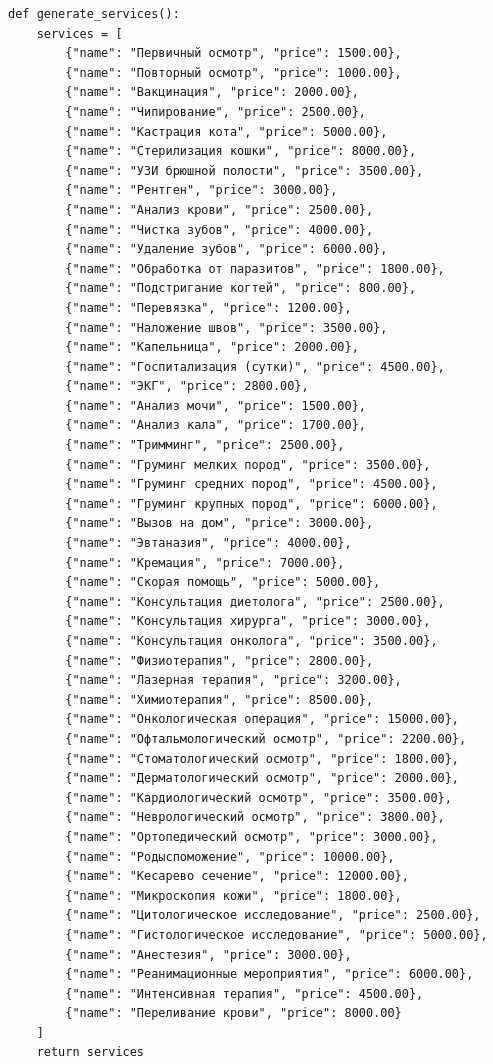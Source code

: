 \documentclass[a4paper]{article}
\begin{document}
\begin{lstlisting}[caption = Генерация значений для таблиц, basicstyle= \scriptsize \ttfamily]
def generate_services():
    services = [
        {"name": "Первичный осмотр", "price": 1500.00},
        {"name": "Повторный осмотр", "price": 1000.00},
        {"name": "Вакцинация", "price": 2000.00},
        {"name": "Чипирование", "price": 2500.00},
        {"name": "Кастрация кота", "price": 5000.00},
        {"name": "Стерилизация кошки", "price": 8000.00},
        {"name": "УЗИ брюшной полости", "price": 3500.00},
        {"name": "Рентген", "price": 3000.00},
        {"name": "Анализ крови", "price": 2500.00},
        {"name": "Чистка зубов", "price": 4000.00},
        {"name": "Удаление зубов", "price": 6000.00},
        {"name": "Обработка от паразитов", "price": 1800.00},
        {"name": "Подстригание когтей", "price": 800.00},
        {"name": "Перевязка", "price": 1200.00},
        {"name": "Наложение швов", "price": 3500.00},
        {"name": "Капельница", "price": 2000.00},
        {"name": "Госпитализация (сутки)", "price": 4500.00},
        {"name": "ЭКГ", "price": 2800.00},
        {"name": "Анализ мочи", "price": 1500.00},
        {"name": "Анализ кала", "price": 1700.00},
        {"name": "Тримминг", "price": 2500.00},
        {"name": "Груминг мелких пород", "price": 3500.00},
        {"name": "Груминг средних пород", "price": 4500.00},
        {"name": "Груминг крупных пород", "price": 6000.00},
        {"name": "Вызов на дом", "price": 3000.00},
        {"name": "Эвтаназия", "price": 4000.00},
        {"name": "Кремация", "price": 7000.00},
        {"name": "Скорая помощь", "price": 5000.00},
        {"name": "Консультация диетолога", "price": 2500.00},
        {"name": "Консультация хирурга", "price": 3000.00},
        {"name": "Консультация онколога", "price": 3500.00},
        {"name": "Физиотерапия", "price": 2800.00},
        {"name": "Лазерная терапия", "price": 3200.00},
        {"name": "Химиотерапия", "price": 8500.00},
        {"name": "Онкологическая операция", "price": 15000.00},
        {"name": "Офтальмологический осмотр", "price": 2200.00},
        {"name": "Стоматологический осмотр", "price": 1800.00},
        {"name": "Дерматологический осмотр", "price": 2000.00},
        {"name": "Кардиологический осмотр", "price": 3500.00},
        {"name": "Неврологический осмотр", "price": 3800.00},
        {"name": "Ортопедический осмотр", "price": 3000.00},
        {"name": "Родыспоможение", "price": 10000.00},
        {"name": "Кесарево сечение", "price": 12000.00},
        {"name": "Микроскопия кожи", "price": 1800.00},
        {"name": "Цитологическое исследование", "price": 2500.00},
        {"name": "Гистологическое исследование", "price": 5000.00},
        {"name": "Анестезия", "price": 3000.00},
        {"name": "Реанимационные мероприятия", "price": 6000.00},
        {"name": "Интенсивная терапия", "price": 4500.00},
        {"name": "Переливание крови", "price": 8000.00}
    ]
    return services


\end{lstlisting}
\end{document}
